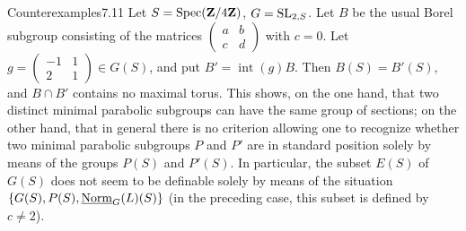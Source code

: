 \begin{enoncerm}{Counterexamples}{7.11}\label{XXVI.7.11}
Let $S=\operatorname{Spec}(\mathbf{Z}/4\mathbf{Z})$, $G=\operatorname{SL}_{2,S}$. Let $B$ be the usual Borel subgroup consisting of the matrices $\left(\begin{smallmatrix}a&b\\c&d\end{smallmatrix}\right)$ with $c=0$. Let $g=\left(\begin{smallmatrix}-1&1\\2&1\end{smallmatrix}\right)\in G(S)$, and put $B'=\operatorname{int}(g)B$. Then $B(S)=B'(S)$, and $B\cap B'$ contains no maximal torus. This shows, on the one hand, that two distinct minimal parabolic subgroups can have the same group of sections; on the other hand, that in general there is no criterion allowing one to recognize whether two minimal parabolic subgroups $P$ and $P'$ are in standard position solely by means of the groups $P(S)$ and $P'(S)$. In particular, the subset $E(S)$ of $G(S)$ does not seem to be definable solely by means of the situation $\{G(S),P(S),\underline{\mathrm{Norm}}_G(L)(S)\}$ (in the preceding case, this subset is defined by $c\neq2$).
\end{enoncerm}
